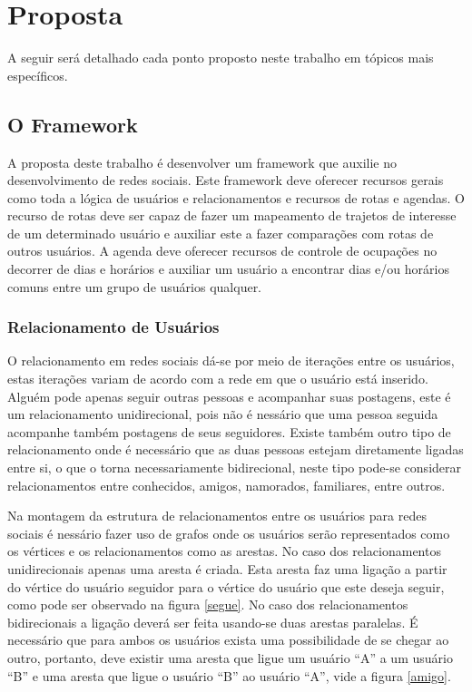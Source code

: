 \chapter{Proposta}

A seguir será detalhado cada ponto proposto neste trabalho em tópicos mais específicos.

\section{O Framework}

A proposta deste trabalho é desenvolver um framework que auxilie no desenvolvimento de redes sociais. Este framework deve oferecer recursos gerais como toda a lógica de usuários e relacionamentos e recursos de rotas e agendas. O recurso de rotas deve ser capaz de fazer um mapeamento de trajetos de interesse de um determinado usuário e auxiliar este a fazer comparações com rotas de outros usuários. A agenda deve oferecer recursos de controle de ocupações no decorrer de dias e horários e auxiliar um usuário a encontrar dias e/ou horários comuns entre um grupo de usuários qualquer.

\subsection{Relacionamento de Usuários}

O relacionamento em redes sociais dá-se por meio de iterações entre os usuários, estas iterações variam de acordo com a rede em que o usuário está inserido. Alguém pode apenas seguir outras pessoas e acompanhar suas postagens, este é um relacionamento unidirecional, pois não é nessário que uma pessoa seguida acompanhe também postagens de seus seguidores. Existe também outro tipo de relacionamento onde é necessário que as duas pessoas estejam diretamente ligadas entre si, o que o torna necessariamente bidirecional, neste tipo pode-se considerar relacionamentos entre conhecidos, amigos, namorados, familiares, entre outros.

Na montagem da estrutura de relacionamentos entre os usuários para redes sociais é nessário fazer uso de grafos onde os usuários serão representados como os vértices e os relacionamentos como as arestas. No caso dos relacionamentos unidirecionais apenas uma aresta é criada. Esta aresta faz uma ligação a partir do vértice do usuário seguidor para o vértice do usuário que este deseja seguir, como pode ser observado na figura \ref{segue}. No caso dos relacionamentos bidirecionais a ligação deverá ser feita usando-se duas arestas paralelas. É necessário que para ambos os usuários exista uma possibilidade de se chegar ao outro, portanto, deve existir uma aresta que ligue um usuário ``A'' a um usuário ``B'' e uma aresta que ligue o usuário ``B'' ao usuário ``A'', vide a figura \ref{amigo}.


